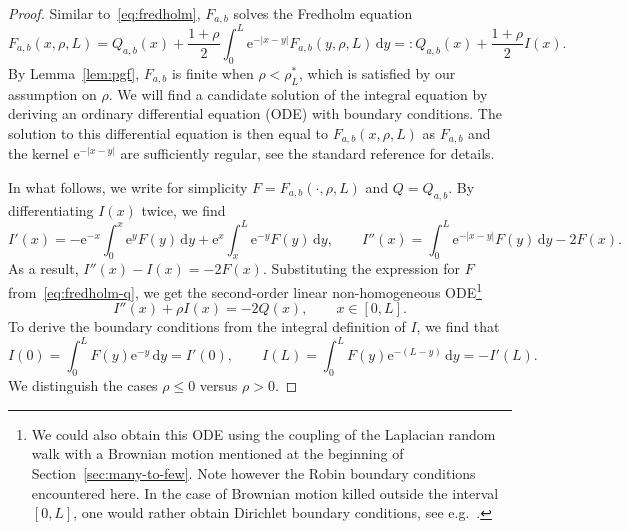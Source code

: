 \documentclass[a4paper, a4wide, 10pt, reqno]{amsart}
\theoremstyle{plain}
\theoremstyle{definition}
\numberwithin{equation}{section}
\newcommand{\re}{{\mathrm e}}
\newcommand{\rd}{\mathrm{d}}
\begin{document}
    \begin{proof}
        Similar to~\eqref{eq:fredholm}, $ F_{a,b}$ solves the Fredholm equation 
        \begin{equation}\label{eq:fredholm-q}
         F_{a,b}(x, \rho, L) = Q_{a, b}(x) + \frac{1+\rho}{2}\int_0^L\re^{-|x-y|}F_{a,b}(y,\rho, L)\, \rd y=: Q_{a,b}(x) + \frac{1+\rho}{2}I(x).
        \end{equation}
        By Lemma~\ref{lem:pgf}, $ F_{a,b}$ is finite when $\rho<\rho^*_L$, which is satisfied by our assumption on $\rho$.  We will find a candidate solution of the integral equation by deriving an ordinary differential equation (ODE) with boundary conditions. The solution to this differential equation is then equal to $ F_{a,b}(x, \rho, L)$ as $F_{a,b}$ and the kernel $\re^{-|x-y|}$ are sufficiently regular, see the standard reference \cite{KressLinear} for details.  \smallskip

        In what follows, we write for simplicity $F = F_{a,b}(\cdot,\rho,L)$ and $Q = Q_{a,b}$. By differentiating $I(x)$ twice, we find 
        \[
        I'(x) =  -\re^{-x}\int_0^x \re^y F(y)\, \rd y + \re^x\int_x^L\re^{-y} F(y)\, \rd y, \qquad I''(x) = \int_0^L\re^{-|x-y|}F(y)\, \rd y - 2F(x).
        \]
        As a result, $I''(x)-I(x)=-2F(x)$. Substituting the expression for $F$ from~\eqref{eq:fredholm-q}, we get the second-order linear non-homogeneous ODE\footnote{We could also obtain this ODE using the coupling of the Laplacian random walk with a Brownian motion mentioned at the beginning of Section~\ref{sec:many-to-few}. Note however the Robin boundary conditions encountered here. In the case of Brownian motion killed outside the interval $[0,L]$, one would rather obtain Dirichlet boundary conditions, see e.g.~\cite[Appendix 1.6]{HandbookBM}.}
        \begin{equation}\label{eq:ode-i}
            I''(x) + \rho I(x) = -2Q(x), \qquad x\in[0,L].
        \end{equation}
        To derive the boundary conditions from the integral definition of $I$, we find that 
        \begin{equation}\label{eq:ode-i-boundary}I(0)=\int_0^LF(y)\re^{-y}\, \rd y=I'(0), \qquad I(L)=\int_0^LF(y)\re^{-(L-y)}\, \rd y=-I'(L).\end{equation}
        We distinguish the cases $\rho\le 0$ versus $\rho>0$. 


\end{proof}
\end{document}
